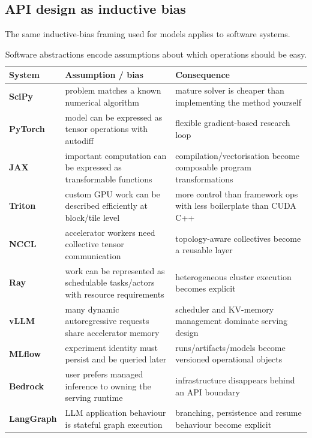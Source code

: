 \subsection{API design as inductive bias}

The same inductive-bias framing used for models applies to software systems.

\begin{table}[ht]
\centering
\small
\begin{tabularx}{\textwidth}{>{\bfseries}p{2.8cm} X X}
\toprule
System & Assumption / bias & Consequence \\
\midrule
SciPy & problem matches a known numerical algorithm & mature solver is cheaper than implementing the method yourself \\
PyTorch & model can be expressed as tensor operations with autodiff & flexible gradient-based research loop \\
JAX & important computation can be expressed as transformable functions & compilation/vectorisation become composable program transformations \\
Triton & custom GPU work can be described efficiently at block/tile level & more control than framework ops with less boilerplate than CUDA C++ \\
NCCL & accelerator workers need collective tensor communication & topology-aware collectives become a reusable layer \\
Ray & work can be represented as schedulable tasks/actors with resource requirements & heterogeneous cluster execution becomes explicit \\
vLLM & many dynamic autoregressive requests share accelerator memory & scheduler and KV-memory management dominate serving design \\
MLflow & experiment identity must persist and be queried later & runs/artifacts/models become versioned operational objects \\
Bedrock & user prefers managed inference to owning the serving runtime & infrastructure disappears behind an API boundary \\
LangGraph & LLM application behaviour is stateful graph execution & branching, persistence and resume behaviour become explicit \\
\bottomrule
\end{tabularx}
\caption{Software abstractions encode assumptions about which operations should be easy.}
\label{tab:api-bias}
\end{table}


